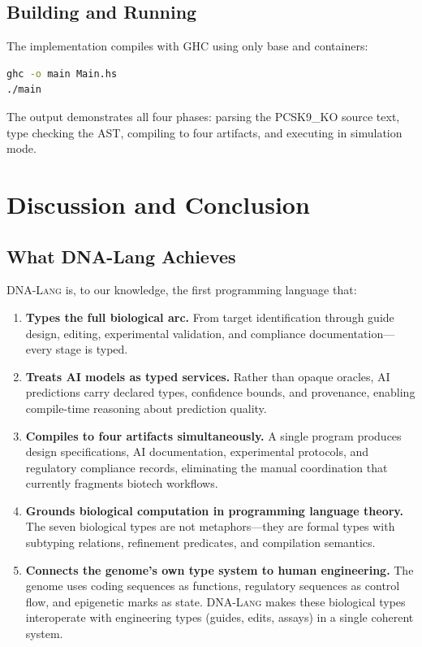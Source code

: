 \documentclass[12pt,a4paper]{article}
\newcommand{\DNALang}{\textsc{DNA-Lang}}
\begin{document}
\subsection{Building and Running}

The implementation compiles with GHC using only base and containers:

\begin{lstlisting}[style=haskellstyle,caption={Build and run.},label={lst:build},language=bash,morekeywords={ghc}]
ghc -o main Main.hs
./main
\end{lstlisting}

The output demonstrates all four phases: parsing the PCSK9\_KO source text, type checking the AST, compiling to four artifacts, and executing in simulation mode.


\section{Discussion and Conclusion}
\label{sec:discussion}

\subsection{What DNA-Lang Achieves}

\DNALang{} is, to our knowledge, the first programming language that:

\begin{enumerate}
    \item \textbf{Types the full biological arc.} From target identification through guide design, editing, experimental validation, and compliance documentation---every stage is typed.

    \item \textbf{Treats AI models as typed services.} Rather than opaque oracles, AI predictions carry declared types, confidence bounds, and provenance, enabling compile-time reasoning about prediction quality.

    \item \textbf{Compiles to four artifacts simultaneously.} A single program produces design specifications, AI documentation, experimental protocols, and regulatory compliance records, eliminating the manual coordination that currently fragments biotech workflows.

    \item \textbf{Grounds biological computation in programming language theory.} The seven biological types are not metaphors---they are formal types with subtyping relations, refinement predicates, and compilation semantics.

    \item \textbf{Connects the genome's own type system to human engineering.} The genome uses coding sequences as functions, regulatory sequences as control flow, and epigenetic marks as state. \DNALang{} makes these biological types interoperate with engineering types (guides, edits, assays) in a single coherent system.
\end{enumerate}
\end{document}
